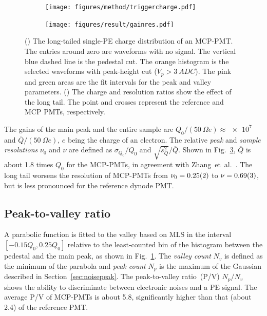 \begin{figure}[!htbp]
    \centering
    \begin{subfigure}[b]{\SF\textwidth}
        \texttt{[image: figures/method/triggercharge.pdf]}
        \caption{}%
        \label{fig:triggercharge}
    \end{subfigure}
    \begin{subfigure}[b]{\SF\textwidth}
        \texttt{[image: figures/result/gainres.pdf]}
        \caption{}
        \label{fig:totalchargeCompare}
    \end{subfigure}
    \caption{() The long-tailed single-PE charge distribution of an MCP-PMT. The entries around zero are waveforms with no signal. The vertical blue dashed line is the pedestal cut. The orange histogram is the selected waveforms with peak-height cut ($V_p>\SI{3}{ADC}$). The pink and green areas are the fit intervals for the peak and valley parameters. () The charge and resolution ratios show the effect of the long tail. The point and crosses represent the reference and MCP PMTs, respectively.
    }
\end{figure}

The gains of the main peak and the entire sample are ${Q_0}/({\SI{50}{\Omega}} e) \approx \num{e7}$ and ${\overline{Q}}/(\SI{50}{\Omega} e)$, $e$ being the charge of an electron. The relative \emph{peak} and \emph{sample resolutions} $\nu_0$ and $\nu$ are defined as ${\sigma_{Q_0}}/{Q_0}$ and ${\sqrt{s^2_{Q}}}/{\overline{Q}}$.  Shown in Fig.~\ref{fig:totalchargeCompare}, $\overline{Q}$ is about 1.8 times $Q_0$ for the MCP-PMTs, in agreement with Zhang~et~al.~\cite{JUNOLongtail}. The long tail worsens the resolution of MCP-PMTs from $\nu_0=\num{0.25 \pm 0.02}$ to $\nu=\num{0.69 \pm 0.03}$, but is less pronounced for the reference dynode PMT.

\subsection{Peak-to-valley ratio}
A parabolic function is fitted to the valley based on MLS in the interval $[-0.15Q_0, 0.25Q_0]$ relative to the least-counted bin of the histogram between the pedestal and the main peak, as shown in Fig.~\ref{fig:triggercharge}. The \emph{valley count} $N_v$ is defined as the minimum of the parabola and \emph{peak count} $N_p$ is the maximum of the Gaussian described in Section~\ref{sec:noisepeak}. The peak-to-valley ratio~(P/V) ${N_p}/{N_v}$ shows the ability to discriminate between electronic noises and a PE signal. The average P/V of MCP-PMTs is about 5.8, significantly higher than that (about 2.4) of the reference PMT.

